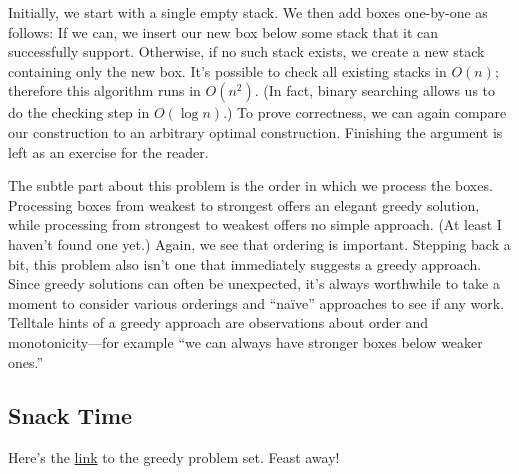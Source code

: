 Initially, we start with a single empty stack. We then add boxes one-by-one as follows: If we can, we insert our new box below some stack that it can successfully support. Otherwise, if no such stack exists, we create a new stack containing only the new box. It's possible to check all existing stacks in $O(n)$; therefore this algorithm runs in $O(n^2)$. (In fact, binary searching allows us to do the checking step in $O(\log n)$.) To prove correctness, we can again compare our construction to an arbitrary optimal construction. Finishing the argument is left as an exercise for the reader.

The subtle part about this problem is the order in which we process the boxes. Processing boxes from weakest to strongest offers an elegant greedy solution, while processing from strongest to weakest offers no simple approach. (At least I haven't found one yet.) Again, we see that ordering is important. Stepping back a bit, this problem also isn't one that immediately suggests a greedy approach. Since greedy solutions can often be unexpected, it's always worthwhile to take a moment to consider various orderings and ``na\"ive'' approaches to see if any work. Telltale hints of a greedy approach are observations about order and monotonicity---for example ``we can always have stronger boxes below weaker ones.''

\subsection{Snack Time}

Here's the \href{http://codeforces.com}{link} to the greedy problem set. Feast away!
